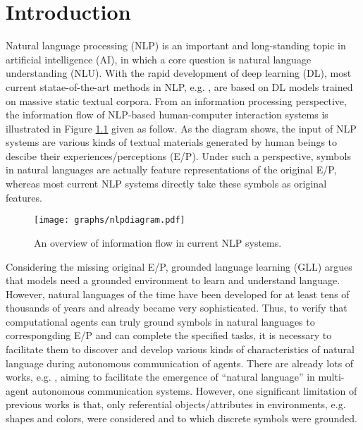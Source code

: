 \chapter{Introduction}
\label{ch1:intro}

Natural language processing (NLP) is an important and long-standing topic in artificial intelligence (AI), in which a core question is natural language understanding (NLU). With the rapid development of deep learning (DL), most current statae-of-the-art methods in NLP, e.g. \cite{socher2013recursive, word2vec2013, kim2014cnn}, are based on DL models trained on massive static textual corpora. From an information processing perspective, the information flow of NLP-based human-computer interaction systems is illustrated in Figure \ref{fig1:nlpdiagram} given as follow. As the diagram shows, the input of NLP systems are various kinds of textual materials generated by human beings to descibe their experiences/perceptions (E/P). Under such a perspective, symbols in natural languages are actually feature representations of the original E/P, whereas most current NLP systems directly take these symbols as original features.

\begin{figure}[!h]
  \centering
  \texttt{[image: graphs/nlpdiagram.pdf]}
  \caption{An overview of information flow in current NLP systems.}
  \label{fig1:nlpdiagram}
\end{figure}

Considering the missing original E/P, grounded language learning (GLL) argues that models need a grounded environment to learn and understand language\cite{matuszek2018grounded}. However, natural languages of the time have been developed for at least tens of thousands of years\cite{berwick2016only} and already became very sophisticated. Thus, to verify that computational agents can truly ground symbols in natural languages to correspongding E/P and can complete the specified tasks, it is necessary to facilitate them to discover and develop various kinds of characteristics of natural language during autonomous communication of agents. There are already lots of works, e.g. \cite{hill2017understanding, havrylov2017emergence, yu2018interactive, kottur2017natural}, aiming to facilitate the emergence of ``natural language'' in multi-agent autonomous communication systems. However, one significant limitation of previous works is that, only referential objects/attributes in environments, e.g. shapes and colors, were considered and to which discrete symbols were grounded.

